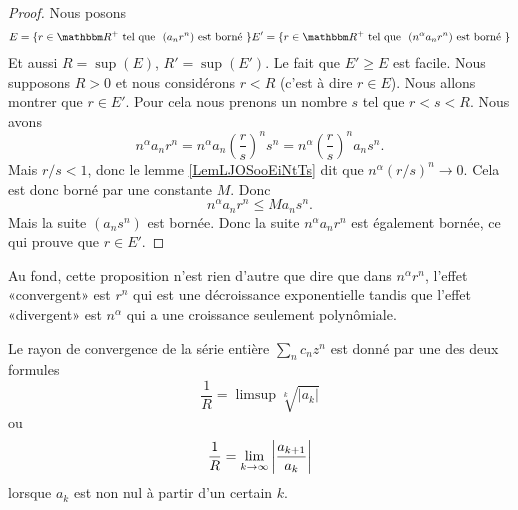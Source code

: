 \begin{proof}
    Nous posons
    \begin{subequations}
        \begin{align}
            E=\{ r\in \eR^+\tq \text{  \( (a_nr^n)\) est borné } \}
            E'=\{ r\in \eR^+\tq \text{  \( (n^{\alpha}a_nr^n)\) est borné } \}
        \end{align}
    \end{subequations}
    Et aussi \( R=\sup(E)\), \( R'=\sup(E')\). Le fait que \( E'\geq E\) est facile. Nous supposons \( R>0\) et nous considérons \( r<R\) (c'est à dire \( r\in E\)).  Nous allons montrer que \( r\in E'\). Pour cela nous prenons un nombre \( s\) tel que \( r<s<R\). Nous avons
    \begin{equation}
        n^{\alpha}a_nr^n=n^{\alpha}a_n\left( \frac{ r }{ s } \right)^ns^n=n^{\alpha}\left( \frac{ r }{ s } \right)^na_ns^n.
    \end{equation}
    Mais \( r/s<1\), donc le lemme \ref{LemLJOSooEiNtTs} dit que \( n^{\alpha}(r/s)^n\to 0\). Cela est donc borné par une constante \( M\). Donc
    \begin{equation}
        n^{\alpha}a_nr^n\leq Ma_ns^n.
    \end{equation}
    Mais la suite \( (a_ns^n)\) est bornée. Donc la suite \( n^{\alpha}a_nr^n\) est également bornée, ce qui prouve que \( r\in E'\).
\end{proof}

\begin{remark}
    Au fond, cette proposition n'est rien d'autre que dire que dans \( n^\alpha r^n\), l'effet «convergent» est \( r^n\) qui est une décroissance exponentielle tandis que l'effet «divergent» est \( n^{\alpha}\) qui a une croissance seulement polynômiale.
\end{remark}

\begin{theorem}		\label{ThoSerPuissRap}
Le rayon de convergence de la série entière \( \sum_n c_n z^n\) est donné par une des deux formules
\begin{equation}		\label{EqRayCOnvSer}
	\frac{1}{ R } =\limsup\sqrt[k]{| a_k |}
\end{equation}
ou
\begin{equation}		\label{EqAlphaSerPuissAtern}
	\frac{1}{ R }=\limite k \infty \abs{\frac{a_{k+1}}{a_k}}
\end{equation}
lorsque $a_k$ est non nul à partir d'un certain $k$.
\end{theorem}

